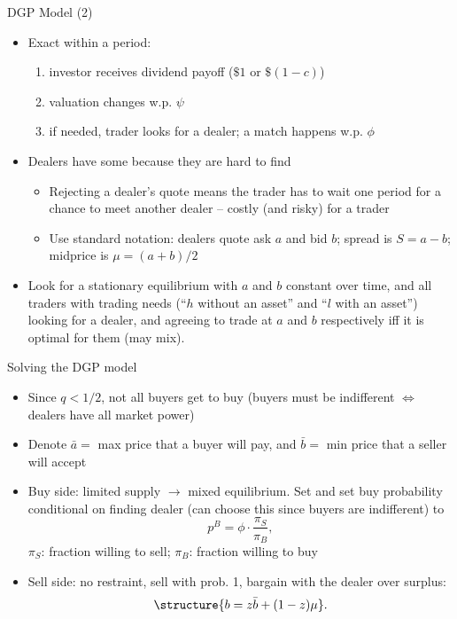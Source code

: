 \documentclass[english,10pt
,aspectratio=169
]{beamer}
\begin{document}
\begin{frame}{DGP Model (2)}
\begin{itemize}
	\item Exact  within a period:
	\begin{enumerate}
		\item investor receives dividend payoff ($\$1$ or $\$(1-c)$)
		\item valuation changes w.p. $\psi$
		\item if needed, trader looks for a dealer; a match happens w.p. $\phi$
	\end{enumerate}
	\item Dealers have some  because they are hard to find
	\begin{itemize}
		\item Rejecting a dealer's quote means the trader has to wait one period for a chance to meet another dealer -- costly (and risky) for a trader
		\item Use standard notation: dealers quote ask $a$ and bid $b$; spread is $S=a-b$; midprice is $\mu = (a+b)/2$
	\end{itemize}
	\item Look for a stationary equilibrium with $a$ and $b$ constant over time, and all traders with trading needs (``$h$ without an asset'' and ``$l$ with an asset'') looking for a dealer, and agreeing to trade at $a$ and $b$ respectively iff it is optimal for them (may mix).  
\end{itemize}
\end{frame}


\begin{frame}{Solving the DGP model}
	\begin{itemize}
		\item Since $q<1/2$, not all buyers get to buy (buyers must be indifferent $\iff$ dealers have all market power)
		\item Denote $\bar{a}=$ max price that a buyer will pay, and $\bar{b}=$ min price that a seller will accept
		\item \alert{Buy side:} limited supply $\rightarrow$ mixed equilibrium. Set  and set buy probability conditional on finding dealer (can choose this since buyers are indifferent) to
		\[
		p^B = \phi \cdot \frac{\pi_S}{\pi_B},
		\]
		\alert{$\pi_S$}: fraction willing to sell; \alert{$\pi_B$}: fraction willing to buy
		\item \alert{Sell side:} no restraint, sell with prob. 1, bargain with the dealer over surplus: 
		\[
		\structure{b=z\bar{b}+(1-z)\mu}.
		\]
	\end{itemize}
\end{frame}
\end{document}
